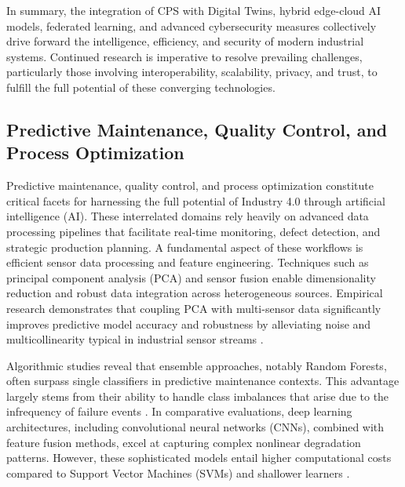\documentclass[sigconf]{acmart}
\begin{document}
\bigskip

\noindent In summary, the integration of CPS with Digital Twins, hybrid edge-cloud AI models, federated learning, and advanced cybersecurity measures collectively drive forward the intelligence, efficiency, and security of modern industrial systems. Continued research is imperative to resolve prevailing challenges, particularly those involving interoperability, scalability, privacy, and trust, to fulfill the full potential of these converging technologies.

\subsection{Predictive Maintenance, Quality Control, and Process Optimization}

Predictive maintenance, quality control, and process optimization constitute critical facets for harnessing the full potential of Industry 4.0 through artificial intelligence (AI). These interrelated domains rely heavily on advanced data processing pipelines that facilitate real-time monitoring, defect detection, and strategic production planning. A fundamental aspect of these workflows is efficient sensor data processing and feature engineering. Techniques such as principal component analysis (PCA) and sensor fusion enable dimensionality reduction and robust data integration across heterogeneous sources. Empirical research demonstrates that coupling PCA with multi-sensor data significantly improves predictive model accuracy and robustness by alleviating noise and multicollinearity typical in industrial sensor streams \cite{ref30,ref33}.

Algorithmic studies reveal that ensemble approaches, notably Random Forests, often surpass single classifiers in predictive maintenance contexts. This advantage largely stems from their ability to handle class imbalances that arise due to the infrequency of failure events \cite{ref29}. In comparative evaluations, deep learning architectures, including convolutional neural networks (CNNs), combined with feature fusion methods, excel at capturing complex nonlinear degradation patterns. However, these sophisticated models entail higher computational costs compared to Support Vector Machines (SVMs) and shallower learners \cite{ref24,ref32}.
\end{document}
